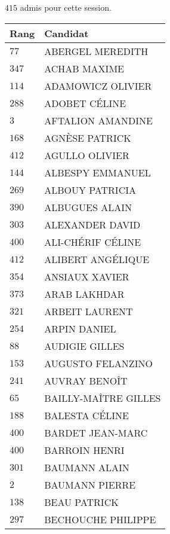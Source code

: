 



  $415$ admis pour cette session.

  \begin{xltabular}{\linewidth}{|l|X|}
    \hline
    \textbf{Rang} & \textbf{Candidat} \\
    \hline
    $77$ & ABERGEL MEREDITH \\
    \hline
    $347$ & ACHAB MAXIME \\
    \hline
    $114$ & ADAMOWICZ OLIVIER \\
    \hline
    $288$ & ADOBET CÉLINE \\
    \hline
    $3$ & AFTALION AMANDINE \\
    \hline
    $168$ & AGNÈSE PATRICK \\
    \hline
    $412$ & AGULLO OLIVIER \\
    \hline
    $144$ & ALBESPY EMMANUEL \\
    \hline
    $269$ & ALBOUY PATRICIA \\
    \hline
    $390$ & ALBUGUES ALAIN \\
    \hline
    $303$ & ALEXANDER DAVID \\
    \hline
    $400$ & ALI-CHÉRIF CÉLINE \\
    \hline
    $412$ & ALIBERT ANGÉLIQUE \\
    \hline
    $354$ & ANSIAUX XAVIER \\
    \hline
    $373$ & ARAB LAKHDAR \\
    \hline
    $321$ & ARBEIT LAURENT \\
    \hline
    $254$ & ARPIN DANIEL \\
    \hline
    $88$ & AUDIGIE GILLES \\
    \hline
    $153$ & AUGUSTO FELANZINO \\
    \hline
    $241$ & AUVRAY BENOÎT \\
    \hline
    $65$ & BAILLY-MAÎTRE GILLES \\
    \hline
    $188$ & BALESTA CÉLINE \\
    \hline
    $400$ & BARDET JEAN-MARC \\
    \hline
    $400$ & BARROIN HENRI \\
    \hline
    $301$ & BAUMANN ALAIN \\
    \hline
    $2$ & BAUMANN PIERRE \\
    \hline
    $138$ & BEAU PATRICK \\
    \hline
    $297$ & BECHOUCHE PHILIPPE \\

\end{xltabular}
